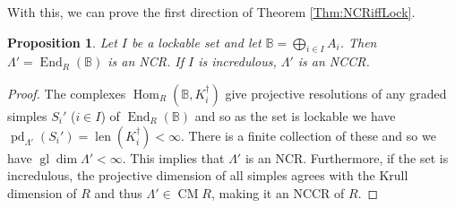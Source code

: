 \documentclass[reqno, 12pt]{amsart}
\newtheorem{proposition}[theorem]{Proposition}
\theoremstyle{definition}
\numberwithin{equation}{section}
\newcommand{\Hom}{\operatorname{Hom}}
\newcommand{\End}{\operatorname{End}}
\newcommand{\gldim}{\operatorname{gl}\dim}
\begin{document}
With this, we can prove the first direction of Theorem \ref{Thm:NCRiffLock}.

\begin{proposition}
    \label{Prop:LockGivesNCR}
    Let $I$ be a lockable set and let $\mathbb{B}=\bigoplus_{i\in I}A_i$. Then $\Lambda'=\End_R(\mathbb{B})$ is an NCR. If $I$ is incredulous, $\Lambda'$ is an NCCR.
\end{proposition}
\begin{proof}
    The complexes $\Hom_R(\mathbb{B},K_i^\dagger)$ give projective resolutions of any graded simples $S_i'$ ($i\in I$) of $\End_R(\mathbb{B})$ and so as the set is lockable we have $\operatorname{pd}_{\Lambda'}(S_i')=\operatorname{len}(K_i^\dagger)<\infty$. There is a finite collection of these and so
    we have $\gldim\Lambda'<\infty$. This implies that $\Lambda'$ is an NCR. Furthermore, if the set is incredulous, the projective dimension of all simples agrees with the Krull dimension of $R$ and thus $\Lambda'\in \operatorname{CM}R$, making it an NCCR of $R$.
\end{proof}
\end{document}
